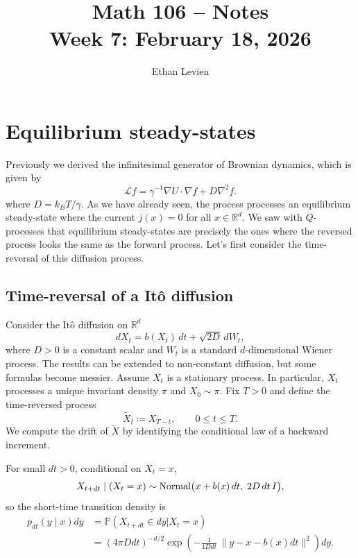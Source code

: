 \documentclass[11pt]{article}
\title{Math 106 -- Notes \\ Week 7: February 18, 2026}
\author{Ethan Levien}
\date{}
\begin{document}
\maketitle



\section*{Equilibrium steady-states}


Previously we derived the infinitesimal generator of Brownian dynamics, which is given by 
\begin{equation}\label{eq:brownian_generator}
\mathcal L f = \gamma^{-1} \nabla U \cdot \nabla f + D \nabla^2 f.
\end{equation}
where $D = k_BT/\gamma$. As we have already seen, the process processes an equilibrium steady-state where the current $j(x)=0$ for all $x \in {\mathbb R}^d$. We saw with $Q$-processes that equilibrium steady-states are precisely the ones where the reversed process looks the same as the forward process. Let's first consider the time-reversal of this diffusion process. 


\subsection*{Time-reversal of a It\^o diffusion}

Consider the It\^o diffusion on ${\mathbb R}^d$
\begin{equation}
dX_t = b(X_t)\,dt + \sqrt{2D}\,dW_t,
\end{equation}
where $D>0$ is a constant scalar and $W_t$ is a standard $d$-dimensional Wiener process. The results can be extended to non-constant diffusion, but some formulas become messier. Assume $X_t$ is a stationary process. In particular, $X_t$ processes a unique invariant density $\pi$ and $X_0\sim \pi$. Fix $T>0$ and define the time-reversed process
\begin{equation}
\tilde X_t \coloneqq X_{T-t},\qquad 0\le t\le T.
\end{equation}
We compute the drift of $\tilde X$ by identifying the conditional law of a backward increment.


For small $dt>0$, conditional on $X_t=x$,
\begin{equation}
X_{t+dt}\mid (X_t=x) \sim  {\rm Normal}\big(x+b(x)\,dt,\;2D\,dt\,I\big),
\end{equation}
so the short-time transition density is
\begin{align}
p_{dt}(y\mid x)dy&= {\mathbb P}(X_{t+dt} \in dy|X_t = x)  \\
&=
(4\pi D dt)^{-d/2}
\exp\!\left(
-\frac{1}{4Ddt}\,\|y-x-b(x)dt\|^2
\right)dy.
\end{align}
\end{document}
